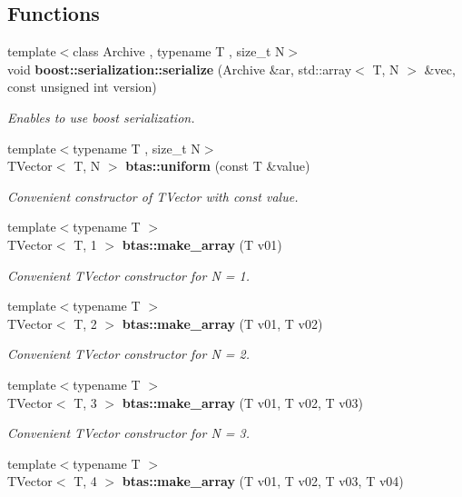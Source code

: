 \subsection*{Functions}
\begin{DoxyCompactItemize}
\item 
{\footnotesize template$<$class Archive , typename T , size\-\_\-t N$>$ }\\void {\bf boost\-::serialization\-::serialize} (Archive \&ar, std\-::array$<$ T, N $>$ \&vec, const unsigned int version)
\begin{DoxyCompactList}\small\item\em Enables to use boost serialization. \end{DoxyCompactList}\item 
{\footnotesize template$<$typename T , size\-\_\-t N$>$ }\\T\-Vector$<$ T, N $>$ {\bf btas\-::uniform} (const T \&value)
\begin{DoxyCompactList}\small\item\em Convenient constructor of T\-Vector with const value. \end{DoxyCompactList}\item 
{\footnotesize template$<$typename T $>$ }\\T\-Vector$<$ T, 1 $>$ {\bf btas\-::make\-\_\-array} (T v01)
\begin{DoxyCompactList}\small\item\em Convenient T\-Vector constructor for N = 1. \end{DoxyCompactList}\item 
{\footnotesize template$<$typename T $>$ }\\T\-Vector$<$ T, 2 $>$ {\bf btas\-::make\-\_\-array} (T v01, T v02)
\begin{DoxyCompactList}\small\item\em Convenient T\-Vector constructor for N = 2. \end{DoxyCompactList}\item 
{\footnotesize template$<$typename T $>$ }\\T\-Vector$<$ T, 3 $>$ {\bf btas\-::make\-\_\-array} (T v01, T v02, T v03)
\begin{DoxyCompactList}\small\item\em Convenient T\-Vector constructor for N = 3. \end{DoxyCompactList}\item 
{\footnotesize template$<$typename T $>$ }\\T\-Vector$<$ T, 4 $>$ {\bf btas\-::make\-\_\-array} (T v01, T v02, T v03, T v04)

\end{DoxyCompactItemize}

